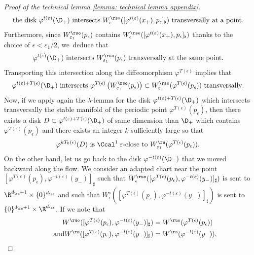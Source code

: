 \begin{appendix}
\begin{proof}[Proof of the technical lemma \ref{lemma: technical lemma appendix}]
\[
\text{the disk $\varphi^{t (\varepsilon)} (\D_{+})$ intersects $W_{\epsilon}^{\rso} ([\varphi^{t (\varepsilon)} (x_+),p_{\epsilon}]_{\flat})$ transversally at a point.}
\]
Furthermore, since $W_{\varepsilon_1}^{\rso} (p_{\epsilon})$ contains $W_{\epsilon}^{\rso} ([\varphi^{t (\varepsilon)} (x_+),p_{\epsilon}]_{\flat})$ thanks to the choice of $\epsilon < \varepsilon_1 / 2$, we~deduce that
\[
\varphi^{t (\varepsilon)} (\D_{+}) \text{ intersects } W_{\varepsilon_1}^{\rso} (p_{\epsilon}) \text{ transversally at the same point}.
\]
Transporting this intersection along the diffeomorphism $\varphi^{T (\epsilon)}$ implies that
\[
\varphi^{t (\varepsilon)+ T (\epsilon)} (\D_{+}) \text{ intersects } \varphi^{T (\epsilon)} \left(W_{\varepsilon_1}^{\rso} (p_{\epsilon}) \right) \subset W_{\varepsilon_1}^{\rso} (\varphi^{T (\epsilon)} (p_{\epsilon})) \text{ transversally}.
\]
Now, if we apply again the $\lambda$-lemma for the disk $\varphi^{t (\varepsilon)+ T (\epsilon)} (\D_{+})$ which intersects transversally the stable manifold of the periodic point $\varphi^{T (\epsilon)} (p_{\epsilon})$, then there exists a disk $D \subset \varphi^{t (\varepsilon)+ T (\epsilon)} (\D_{+})$ of same dimension than $\D_+$ which contains $\varphi^{T (\epsilon)} (p_{\epsilon})$ and there exists an integer $k$ sufficiently large so that
\begin{equation}\label{eq: proof technical lemma - final transversality pushing forward}
\varphi^{k T_0 (\epsilon)} (D) \text{ is } \Ccal^1 \: \varepsilon \text{-close to } W_{\varepsilon_1}^{\ru} (\varphi^{T (\epsilon)} (p_{\epsilon})).
\end{equation}
On the other hand, let us go back to the disk $\varphi^{-t (\varepsilon)}(\D_{-})$ that we moved backward along the flow. We consider an adapted chart near the point $[\varphi^{T (\epsilon)} (p_{\epsilon}), \varphi^{- t (\varepsilon)} (y_-)]_{\sharp}$ such that $W_{\epsilon}^{\ruo}([\varphi^{T (\epsilon)} (p_{\epsilon}), \varphi^{- t (\varepsilon)} (y_-)]_{\sharp}) $ is sent to $\R^{d_\ru + 1} \times \{0\}^{d_\rs}$ and such that $W_{\epsilon}^{s} ([\varphi^{T (\epsilon)} (p_{\varepsilon}), \varphi^{- t (\varepsilon)} (y_-)]_{\sharp}) $ is sent to $\{0\}^{d_\ru + 1 } \times \R^{d_\rs}$. If we note that
\begin{align*}
W^{\ruo}([\varphi^{T (\epsilon)} (p_{\epsilon}), \varphi^{- t (\varepsilon)} (y_-)]_{\sharp}) &= W^{\ruo}(\varphi^{T (\epsilon)} (p_{\epsilon}))\\
\tag*{and}
W^{\rs} ([\varphi^{T (\epsilon)} (p_{\varepsilon}), \varphi^{- t (\varepsilon)} (y_-)]_{\sharp}) &= W^{\rs} (\varphi^{- t (\varepsilon)} (y_-)),

\end{align*}
\end{proof}
\end{appendix}
